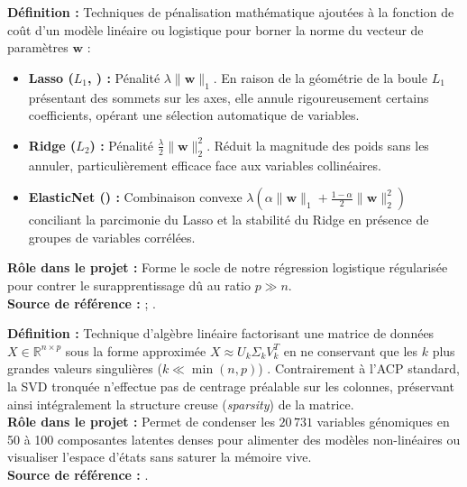 \documentclass[11pt,a4paper]{article}
\begin{document}
\begin{defbox}
\textbf{Définition :} Techniques de pénalisation mathématique ajoutées à la fonction de coût d'un modèle linéaire ou logistique pour borner la norme du vecteur de paramètres $\mathbf{w}$ \citep{tibshirani1996regression,zou2005regularization} :
\begin{itemize}[leftmargin=*, label=$\bullet$]
    \item \textbf{Lasso ($L_1$, \citet{tibshirani1996regression}) :} Pénalité $\lambda \|\mathbf{w}\|_1$. En raison de la géométrie de la boule $L_1$ présentant des sommets sur les axes, elle annule rigoureusement certains coefficients, opérant une sélection automatique de variables.
    \item \textbf{Ridge ($L_2$) :} Pénalité $\frac{\lambda}{2} \|\mathbf{w}\|_2^2$. Réduit la magnitude des poids sans les annuler, particulièrement efficace face aux variables collinéaires.
    \item \textbf{ElasticNet (\citet{zou2005regularization}) :} Combinaison convexe $\lambda \left( \alpha \|\mathbf{w}\|_1 + \frac{1-\alpha}{2} \|\mathbf{w}\|_2^2 \right)$ conciliant la parcimonie du Lasso et la stabilité du Ridge en présence de groupes de variables corrélées.
\end{itemize}
\textbf{Rôle dans le projet :} Forme le socle de notre régression logistique régularisée pour contrer le surapprentissage dû au ratio $p \gg n$.\\
\textbf{Source de référence :} \citet{tibshirani1996regression} ; \citet{zou2005regularization}.
\end{defbox}

\begin{defbox}
\textbf{Définition :} Technique d'algèbre linéaire factorisant une matrice de données $X \in \mathbb{R}^{n \times p}$ sous la forme approximée $X \approx U_k \Sigma_k V_k^T$ en ne conservant que les $k$ plus grandes valeurs singulières ($k \ll \min(n, p)$) \citep{halko2011finding}. Contrairement à l'ACP standard, la SVD tronquée n'effectue pas de centrage préalable sur les colonnes, préservant ainsi intégralement la structure creuse (\textit{sparsity}) de la matrice.\\
\textbf{Rôle dans le projet :} Permet de condenser les $20\,731$ variables génomiques en 50 à 100 composantes latentes denses pour alimenter des modèles non-linéaires ou visualiser l'espace d'états sans saturer la mémoire vive.\\
\textbf{Source de référence :} \citet{halko2011finding}.
\end{defbox}
\end{document}
